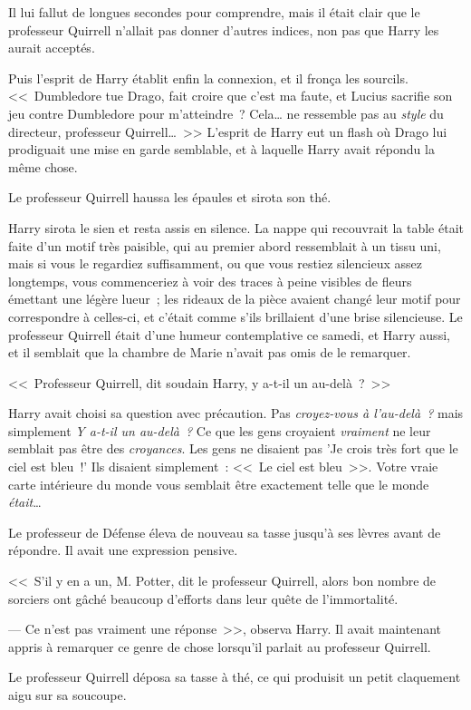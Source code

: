 Il lui fallut de longues secondes pour comprendre, mais il était clair que le professeur Quirrell n'allait pas donner d'autres indices, non pas que Harry les aurait acceptés.

Puis l'esprit de Harry établit enfin la connexion, et il fronça les sourcils. <<~Dumbledore tue Drago, fait croire que c'est ma faute, et Lucius sacrifie son jeu contre Dumbledore pour m'atteindre~? Cela… ne ressemble pas au \emph{style} du directeur, professeur Quirrell…~>> L'esprit de Harry eut un flash où Drago lui prodiguait une mise en garde semblable, et à laquelle Harry avait répondu la même chose.

Le professeur Quirrell haussa les épaules et sirota son thé.

Harry sirota le sien et resta assis en silence. La nappe qui recouvrait la table était faite d'un motif très paisible, qui au premier abord ressemblait à un tissu uni, mais si vous le regardiez suffisamment, ou que vous restiez silencieux assez longtemps, vous commenceriez à voir des traces à peine visibles de fleurs émettant une légère lueur~; les rideaux de la pièce avaient changé leur motif pour correspondre à celles-ci, et c'était comme s'ils brillaient d'une brise silencieuse. Le professeur Quirrell était d'une humeur contemplative ce samedi, et Harry aussi, et il semblait que la chambre de Marie n'avait pas omis de le remarquer.

<<~Professeur Quirrell, dit soudain Harry, y a-t-il un au-delà~?~>>

Harry avait choisi sa question avec précaution. Pas \emph{croyez-vous à l'au-delà~?} mais simplement \emph{Y a-t-il un au-delà~?} Ce que les gens croyaient \emph{vraiment} ne leur semblait pas être des \emph{croyances}. Les gens ne disaient pas 'Je crois très fort que le ciel est bleu~!' Ils disaient simplement~: <<~Le ciel est bleu~>>. Votre vraie carte intérieure du monde vous semblait être exactement telle que le monde \emph{était}…

Le professeur de Défense éleva de nouveau sa tasse jusqu'à ses lèvres avant de répondre. Il avait une expression pensive.

<<~S'il y en a un, M. Potter, dit le professeur Quirrell, alors bon nombre de sorciers ont gâché beaucoup d'efforts dans leur quête de l'immortalité.

--- Ce n'est pas vraiment une réponse~>>, observa Harry. Il avait maintenant appris à remarquer ce genre de chose lorsqu'il parlait au professeur Quirrell.

Le professeur Quirrell déposa sa tasse à thé, ce qui produisit un petit claquement aigu sur sa soucoupe.


